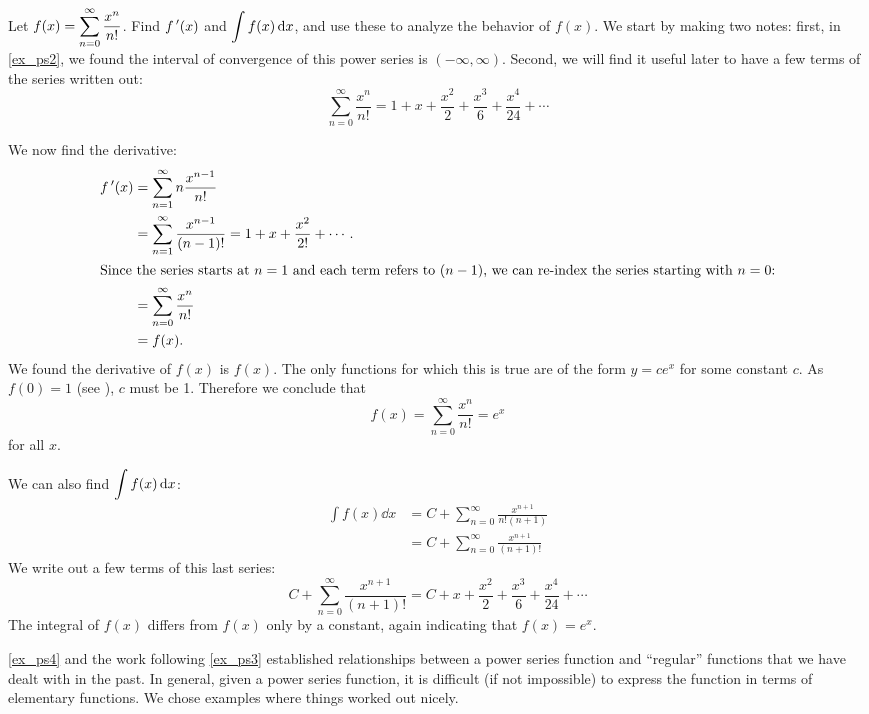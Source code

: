 \begin{example}\label{ex_ps4}%
Let $\displaystyle f(x) = \sum_{n=0}^\infty \frac{x^n}{n!}$. Find $\displaystyle f\,'(x)$ and $\displaystyle \int f(x)\operatorname{d}\! x$, and use these to analyze the behavior of $f(x)$.
\solution
We start by making two notes: first, in \autoref{ex_ps2}, we found the interval of convergence of this power series is $(-\infty,\infty)$. Second, we will find it useful later to have a  few terms of the series written out:
\begin{equation}
\sum_{n=0}^\infty \frac{x^n}{n!}
= 1 + x + \frac{x^2}2+\frac{x^3}{6} + \frac{x^4}{24} +\dotsb\label{eq:ps4}
\end{equation}

We now find the derivative:
\begin{align*}
f\,'(x) &= \sum_{n=1}^\infty n\frac{x^{n-1}}{n!} \\
&=\sum_{n=1}^\infty \frac{x^{n-1}}{(n-1)!} = 1+x+\frac{x^2}{2!}+\dotsb. \\
\intertext{Since the series starts at \(n=1\) and each term refers to \((n-1)\), we can re-index the series starting with \(n=0\):}
		&= \sum_{n=0}^\infty \frac{x^{n}}{n!}\\
		&= f(x).
\end{align*}
We found the derivative of $f(x)$ is $f(x)$. The only functions for which this is true are of the form $y=ce^x$ for some constant $c$. As $f(0) = 1$ (see ), $c$ must be 1. Therefore we conclude that 
\[f(x) = \sum_{n=0}^\infty \frac{x^n}{n!} = e^x\]%
for all $x$.

We can also find $\displaystyle \int f(x)\operatorname{d}\! x$:
\begin{align*}
\int f(x)\dd x &= C+\sum_{n=0}^\infty \frac{x^{n+1}}{n!(n+1)} \\
				&= C+ \sum_{n=0}^\infty \frac{x^{n+1}}{(n+1)!}
\end{align*}
We write out a few terms of this last series:
\[
C+ \sum_{n=0}^\infty \frac{x^{n+1}}{(n+1)!}
= C+ x+ \frac{x^2}2+\frac{x^3}{6}+\frac{x^4}{24}+\dotsb
\]
The integral of $f(x)$ differs from $f(x)$ only by a constant, again indicating that $f(x) = e^x$.
\end{example}


\autoref{ex_ps4} and the work following \autoref{ex_ps3} established relationships between a power series function and ``regular'' functions that we have dealt with in the past. In general, given a power series function, it is difficult (if not impossible) to express the function in terms of elementary functions. We chose examples where things worked out nicely.

